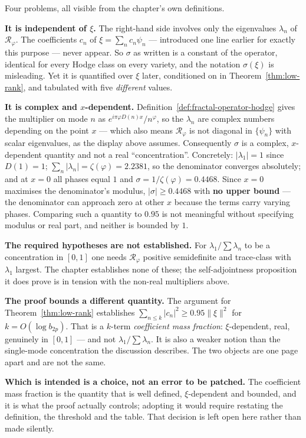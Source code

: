 \begin{remark}
\label{rem:sigma-illposed-2026-10-03}
Four problems, all visible from the chapter's own definitions.

\textbf{It is independent of $\xi$.} The right-hand side involves only the
eigenvalues $\lambda_n$ of $\mathcal{R}_\varphi$. The coefficients $c_n$ of
$\xi = \sum_n c_n\psi_n$ --- introduced one line earlier for exactly this purpose
--- never appear. So $\sigma$ as written is a constant of the operator, identical
for every Hodge class on every variety, and the notation $\sigma(\xi)$ is
misleading. Yet it is quantified over $\xi$ later, conditioned on in
Theorem~\ref{thm:low-rank}, and tabulated with five \emph{different} values.

\textbf{It is complex and $x$-dependent.} Definition~\ref{def:fractal-operator-hodge}
gives the multiplier on mode $n$ as $e^{i\pi\varphi D(n)x}/n^{\varphi}$, so the
$\lambda_n$ are complex numbers depending on the point $x$ --- which also means
$\mathcal{R}_\varphi$ is not diagonal in $\{\psi_n\}$ with scalar eigenvalues, as
the display above assumes. Consequently $\sigma$ is a complex, $x$-dependent
quantity and not a real ``concentration''. Concretely:
$|\lambda_1| = 1$ since $D(1) = 1$; $\sum_n|\lambda_n| = \zeta(\varphi) = 2.2381$,
so the denominator converges absolutely; and at $x = 0$ all phases equal $1$ and
$\sigma = 1/\zeta(\varphi) = \mathbf{0.4468}$. Since $x = 0$ maximises the
denominator's modulus, $|\sigma| \geq 0.4468$ with \textbf{no upper bound} --- the
denominator can approach zero at other $x$ because the terms carry varying
phases. Comparing such a quantity to $0.95$ is not meaningful without specifying
modulus or real part, and neither is bounded by $1$.

\textbf{The required hypotheses are not established.} For $\lambda_1/\sum\lambda_n$
to be a concentration in $[0,1]$ one needs $\mathcal{R}_\varphi$ positive
semidefinite and trace-class with $\lambda_1$ largest. The chapter establishes
none of these; the self-adjointness proposition it does prove is in tension with
the non-real multipliers above.

\textbf{The proof bounds a different quantity.} The argument for
Theorem~\ref{thm:low-rank} establishes
$\sum_{n\leq k}|c_n|^2 \geq 0.95\|\xi\|^2$ for $k = O(\log b_{2p})$. That is a
$k$-term \emph{coefficient mass fraction}: $\xi$-dependent, real, genuinely in
$[0,1]$ --- and not $\lambda_1/\sum\lambda_n$. It is also a weaker notion than
the single-mode concentration the discussion describes. The two objects are one
page apart and are not the same.

\textbf{Which is intended is a choice, not an error to be patched.} The
coefficient mass fraction is the quantity that is well defined, $\xi$-dependent
and bounded, and it is what the proof actually controls; adopting it would require
restating the definition, the threshold and the table. That decision is left
open here rather than made silently.
\end{remark}

